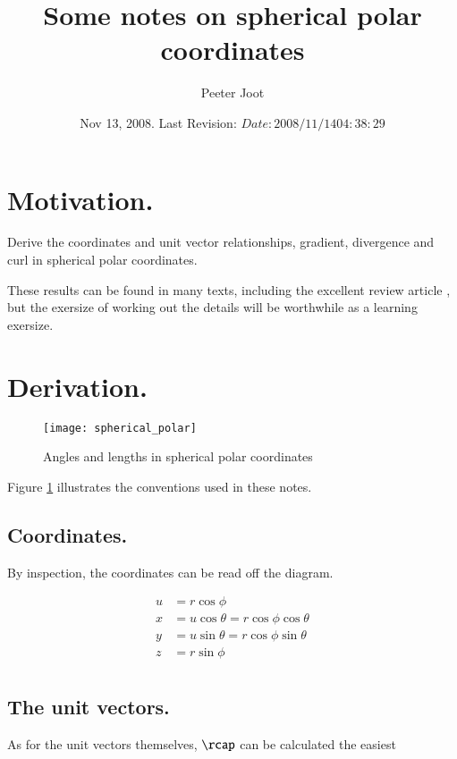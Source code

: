 \documentclass{article}
\title{Some notes on spherical polar coordinates}
\author{Peeter Joot}
\date{ Nov 13, 2008.  Last Revision: $Date: 2008/11/14 04:38:29 $ }
\begin{document}
\maketitle{}

\section{ Motivation. }

Derive the coordinates and unit vector relationships, gradient, divergence and curl in spherical polar coordinates.

These results can be found in many texts, including the excellent review article \cite{fleischCoords}, but 
the exersize of working out the details will be worthwhile as a learning exersize.

\section{ Derivation. }

\begin{figure}[htp]
\centering
\texttt{[image: spherical\_polar]}
\caption{Angles and lengths in spherical polar coordinates}\label{fig:spherical_polar}
\end{figure}

Figure \ref{fig:spherical_polar} illustrates the conventions used in 
these notes.

\subsection{ Coordinates. }

By inspection, the coordinates can be read off the diagram.

\begin{align*}
u &= r \cos\phi \\
x &= u \cos\theta = r \cos\phi \cos\theta \\
y &= u \sin\theta = r \cos\phi \sin\theta \\
z &= r \sin\phi \\
\end{align*}

\subsection{ The unit vectors. }

As for the unit vectors themselves, $\rcap$ can be calculated the easiest
\end{document}
